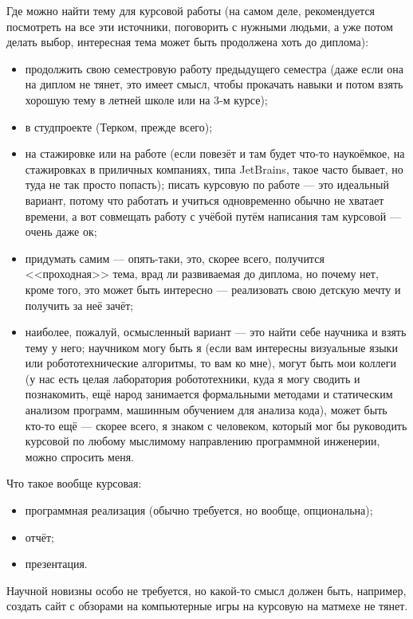 \documentclass[a5paper]{article}
\begin{document}
Где можно найти тему для курсовой работы (на самом деле, рекомендуется посмотреть на все эти источники, поговорить с нужными людьми, а уже потом делать выбор, интересная тема может быть продолжена хоть до диплома):
\begin{itemize}
	\item продолжить свою семестровую работу предыдущего семестра (даже если она на диплом не тянет, это имеет смысл, чтобы прокачать навыки и потом взять хорошую тему в летней школе или на 3-м курсе);
	\item в студпроекте (Терком, прежде всего);
	\item на стажировке или на работе (если повезёт и там будет что-то наукоёмкое, на стажировках в приличных компаниях, типа JetBrains, такое часто бывает, но туда не так просто попасть); писать курсовую по работе --- это идеальный вариант, потому что работать и учиться одновременно обычно не хватает времени, а вот совмещать работу с учёбой путём написания там курсовой --- очень даже ок;
	\item придумать самим --- опять-таки, это, скорее всего, получится <<проходная>> тема, врад ли развиваемая до диплома, но почему нет, кроме того, это может быть интересно --- реализовать свою детскую мечту и получить за неё зачёт;
	\item наиболее, пожалуй, осмысленный вариант --- это найти себе научника и взять тему у него; научником могу быть я (если вам интересны визуальные языки или робототехнические алгоритмы, то вам ко мне), могут быть мои коллеги (у нас есть целая лаборатория робототехники, куда я могу сводить и познакомить, ещё народ занимается формальными методами и статическим анализом программ, машинным обучением для анализа кода), может быть кто-то ещё --- скорее всего, я знаком с человеком, который мог бы руководить курсовой по любому мыслимому направлению программной инженерии, можно спросить меня.
\end{itemize}

Что такое вообще курсовая:
\begin{itemize}
	\item программная реализация (обычно требуется, но вообще, опциональна);
	\item отчёт;
	\item презентация.
\end{itemize}

Научной новизны особо не требуется, но какой-то смысл должен быть, например, создать сайт с обзорами на компьютерные игры на курсовую на матмехе не тянет.
\end{document}
